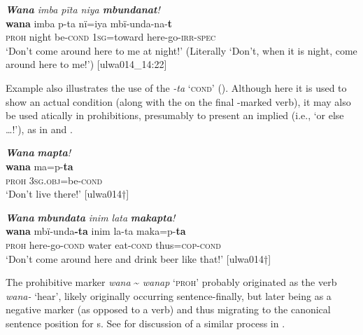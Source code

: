 \ea%
    \label{ex:syntax:115}
          \textit{\textbf{Wana} imba pïta niya \textbf{mbundanat}!}\\
\gll    \textbf{wana}  imba  p-ta    nï=iya      mbï-unda-na-\textbf{t}\\
    \textsc{proh}  night  be\textsc{{}-cond} 1\textsc{sg}=toward  here-go-\textsc{irr-spec}\\
\glt `Don’t come around here to me at night!’ (Literally ‘Don’t, when it is night, come around here to me!’) [ulwa014\_14:22]
\z

Example  also illustrates the use of the   \textit{-ta} ‘\textsc{cond}’ (). Although here it is used to show an actual condition (along with the   on the final -marked verb), it may also be used atically in prohibitions, presumably to present an implied  (i.e., ‘or else …!’), as in  and .

\ea%
    \label{ex:syntax:116}
          \textbf{\textit{Wana}} \textbf{\textit{mapta}}\textit{!}\\
\gll    \textbf{wana}  ma=p-\textbf{ta}\\
    \textsc{proh}  \textsc{3sg.obj}=be\textsc{{}-cond}\\
\glt `Don’t live there!’ [ulwa014†]
\z

\ea%
    \label{ex:syntax:117}
          \textbf{\textit{Wana}} \textbf{\textit{mbundata}} \textit{inim lata} \textbf{\textit{makapta}}\textit{!}\\
\gll    \textbf{wana}  mbï-unda\textbf{{}-ta} inim  la-ta    maka=p-\textbf{ta}\\
    \textsc{proh}  here-go-\textsc{cond}  water  eat\textsc{{}-cond} thus=\textsc{cop-cond}\\
\glt `Don’t come around here and drink beer like that!’ [ulwa014†]
\z

The prohibitive marker \textit{wana} {\textasciitilde} \textit{wanap}  \textsc{‘proh}’ probably originated as the verb \textit{wana-} ‘hear’, likely originally occurring sentence-finally, but later being  as a negative marker (as opposed to a verb) and thus migrating to the canonical sentence position for s. See \citet[118]{Barlow2020b} for discussion of a similar  process in .


